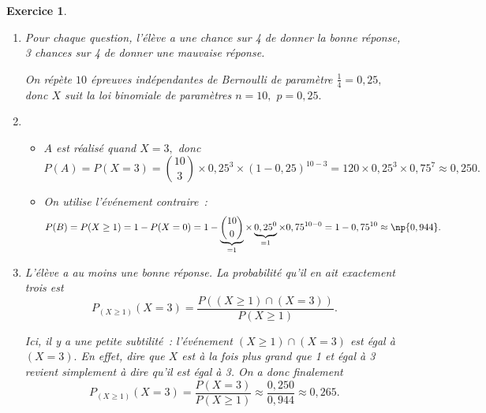 \documentclass[10pt]{article}
\newtheorem{exo}{Exercice}
\begin{document}
\begin{exo}



\begin{enumerate}
\item Pour chaque question, l'élève a une chance sur 4 de donner la bonne réponse, 3 chances sur 4 de donner une mauvaise réponse.

On répète $10$ épreuves indépendantes de Bernoulli de paramètre $\frac{1}{4}=0,25,$ donc $X$ suit la loi binomiale de paramètres $n=10, $ $p=0,25.$

\item \begin{itemize}
\item[\textbullet] $A$ est réalisé quand $X=3,$ donc \[P(A)=P(X=3)=\binom{10}{3}\times 0,25^3\times (1-0,25)^{10-3}=120\times 0,25^3\times 0,75^7\approx 0,250.\]
\item[\textbullet] On utilise l'événement contraire~:
\[P(B)=P(X\geq 1)=1-P(X=0)=1-\underbrace{\binom{10}{0}}_{=1}\times \underbrace{0,25^{0}}_{=1}\times 0,75^{10-0}=1- 0,75^{10}\approx \np{0,944}.\]
\end{itemize}

\item L'élève a au moins une bonne réponse. La probabilité qu'il en ait exactement trois est
\[P_{(X\geq 1)}(X=3)=\frac{P((X\geq 1)\cap (X=3))}{P(X\geq 1)}.\]


Ici, il y a une petite subtilité~: l'événement $(X\geq 1)\cap (X=3)$ est égal à $(X=3).$ En effet, dire que $X$ est à la fois plus grand que 1 et égal à 3 revient simplement à dire qu'il est égal à 3. On a donc finalement
\[P_{(X\geq 1)}(X=3)=\frac{P(X=3)}{P(X\geq 1)}\approx \frac{0,250}{0,944}\approx 0,265.\]

\end{enumerate}


\end{exo}
\end{document}

